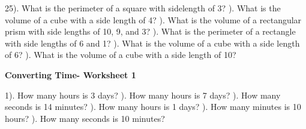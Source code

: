 \documentclass{article}%
\begin{document}
25). What is the perimeter of a square with sidelength of 3?%
\newline%
\newline%
). What is the volume of a cube with a side length of 4?%
\newline%
\newline%
). What is the volume of a rectangular prism with side lengths of 10, 9, and 3?%
\newline%
\newline%
). What is the perimeter of a rectangle with side lengths of 6 and 1?%
\newline%
\newline%
). What is the volume of a cube with a side length of 6?%
\newline%
\newline%
). What is the volume of a cube with a side length of 10?%
\newline%
\newline%
\newline%
\pagebreak%
\large%
\begin{center}%
\textbf{Converting Time- Worksheet 1}%
\newline%
\end{center} \normalsize%
1). How many hours is 3 days?%
\newline%
\newline%
). How many hours is 7 days?%
\newline%
\newline%
). How many seconds is 14 minutes?%
\newline%
\newline%
). How many hours is 1 days?%
\newline%
\newline%
). How many minutes is 10 hours?%
\newline%
\newline%
). How many seconds is 10 minutes?%
\newline%
\newline%
\newline%
\end{document}
